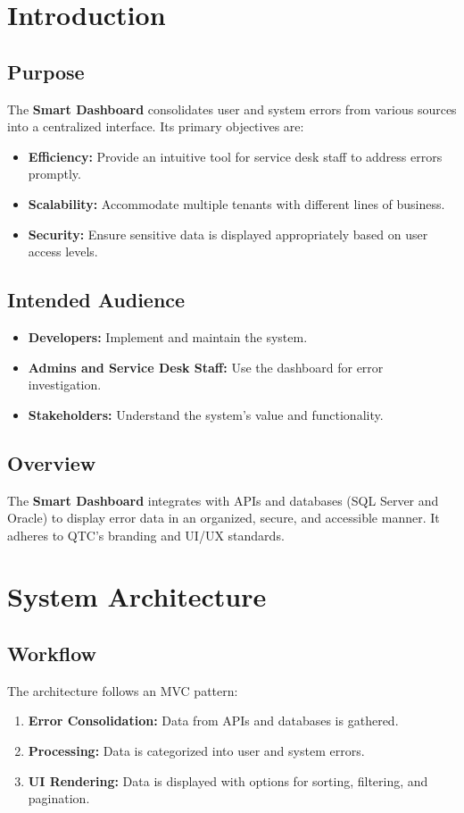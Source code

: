 \documentclass[12pt]{article}
\begin{document}
\newpage

\section{Introduction}
\subsection{Purpose}
The \textbf{Smart Dashboard} consolidates user and system errors from various sources into a centralized interface. Its primary objectives are:
\begin{itemize}
    \item \textbf{Efficiency:} Provide an intuitive tool for service desk staff to address errors promptly.
    \item \textbf{Scalability:} Accommodate multiple tenants with different lines of business.
    \item \textbf{Security:} Ensure sensitive data is displayed appropriately based on user access levels.
\end{itemize}

\subsection{Intended Audience}
\begin{itemize}
    \item \textbf{Developers:} Implement and maintain the system.
    \item \textbf{Admins and Service Desk Staff:} Use the dashboard for error investigation.
    \item \textbf{Stakeholders:} Understand the system’s value and functionality.
\end{itemize}

\subsection{Overview}
The \textbf{Smart Dashboard} integrates with APIs and databases (SQL Server and Oracle) to display error data in an organized, secure, and accessible manner. It adheres to QTC’s branding and UI/UX standards.

\newpage

\section{System Architecture}
\subsection{Workflow}
The architecture follows an MVC pattern:
\begin{enumerate}
    \item \textbf{Error Consolidation:} Data from APIs and databases is gathered.
    \item \textbf{Processing:} Data is categorized into user and system errors.
    \item \textbf{UI Rendering:} Data is displayed with options for sorting, filtering, and pagination.
\end{enumerate}
\end{document}
